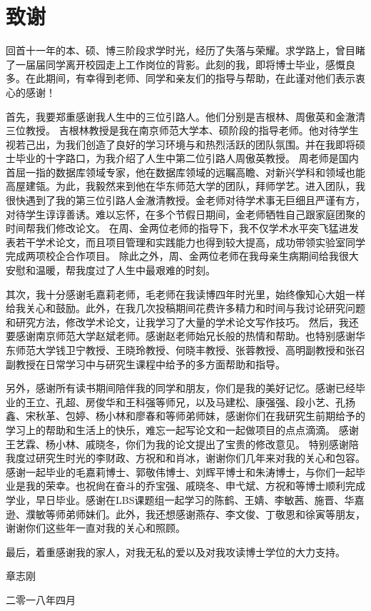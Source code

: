 {\kaishu
\chapter*{致\qquad 谢}
\begin{spacing}{1.5}
	
	
回首十一年的本、硕、博三阶段求学时光，经历了失落与荣耀。求学路上，曾目睹了一届届同学离开校园走上工作岗位的背影。此刻的我，即将博士毕业，感慨良多。在此期间，有幸得到老师、同学和亲友们的指导与帮助，在此谨对他们表示衷心的感谢！
	
首先，我要郑重感谢我人生中的三位引路人。他们分别是吉根林、周傲英和金澈清三位教授。
吉根林教授是我在南京师范大学本、硕阶段的指导老师。他对待学生视若己出，为我们创造了良好的学习环境与和热烈活跃的团队氛围。并在我即将硕士毕业的十字路口，为我介绍了人生中第二位引路人周傲英教授。
周老师是国内首屈一指的数据库领域专家，他在数据库领域的远瞩高瞻、对新兴学科和领域也能高屋建瓴。为此，我毅然来到他在华东师范大学的团队，拜师学艺。进入团队，我很快遇到了我的第三位引路人金澈清教授。金老师对待学术事无巨细且严谨有方，对待学生谆谆善诱。难以忘怀，在多个节假日期间，金老师牺牲自己跟家庭团聚的时间帮我们修改论文。
在周、金两位老师的指导下，我不仅学术水平突飞猛进发表若干学术论文，而且项目管理和实践能力也得到较大提高，成功带领实验室同学完成两项校企合作项目。
除此之外，周、金两位老师在我母亲生病期间给我很大安慰和温暖，帮我度过了人生中最艰难的时刻。


其次，我十分感谢毛嘉莉老师，毛老师在我读博四年时光里，始终像知心大姐一样给我关心和鼓励。此外，在我几次投稿期间花费许多精力和时间与我讨论研究问题和研究方法，修改学术论文，让我学习了大量的学术论文写作技巧。
然后，我还要感谢南京师范大学赵斌老师。感谢赵老师始兄长般的热情和帮助。也特别感谢华东师范大学钱卫宁教授、王晓玲教授、何晓丰教授、张蓉教授、高明副教授和张召副教授在日常学习中与研究生课程中给予的多方面帮助和指导。


另外，感谢所有读书期间陪伴我的同学和朋友，你们是我的美好记忆。感谢已经毕业的王立、孔超、房俊华和王科强等师兄，以及马建松、康强强、段小艺、孔扬鑫、宋秋革、包婷、杨小林和廖春和等师弟师妹，感谢你们在我研究生前期给予的学习上的帮助和生活上的快乐，难忘一起写论文和一起做项目的点点滴滴。
感谢王艺霖、杨小林、戚晓冬，你们为我的论文提出了宝贵的修改意见。
特别感谢陪我度过研究生时光的李财政、方祝和和肖冰，谢谢你们几年来对我的关心和包容。
感谢一起毕业的毛嘉莉博士、郭敬伟博士、刘辉平博士和朱涛博士，与你们一起毕业是我的荣幸。也祝尙在奋斗的乔宝强、戚晓冬、申弋斌、方祝和等博士顺利完成学业，早日毕业。感谢在LBS课题组一起学习的陈鹤、王婧、李敏茜、施晋、华嘉逊、濮敏等师弟师妹们。此外，我还想感谢燕存、李文俊、丁敬恩和徐寅等朋友，谢谢你们这些年一直对我的关心和照顾。

最后，着重感谢我的家人，对我无私的爱以及对我攻读博士学位的大力支持。

\end{spacing}
\vspace{0cm} \hspace{10.8cm}  章志刚

\hspace{9.8cm}  二零一八年四月 }
